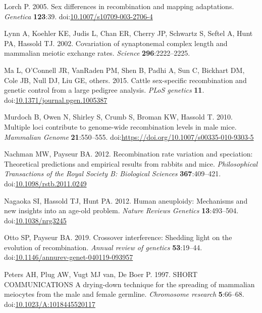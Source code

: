 \documentclass[
]{article}
\begin{document}
\leavevmode\hypertarget{ref-lorch2005}{}%
Lorch P. 2005. Sex differences in recombination and mapping adaptations.
\emph{Genetica} \textbf{123}:39.
doi:\href{https://doi.org/10.1007/s10709-003-2706-4}{10.1007/s10709-003-2706-4}

\leavevmode\hypertarget{ref-lynn2002}{}%
Lynn A, Koehler KE, Judis L, Chan ER, Cherry JP, Schwartz S, Seftel A,
Hunt PA, Hassold TJ. 2002. Covariation of synaptonemal complex length
and mammalian meiotic exchange rates. \emph{Science}
\textbf{296}:2222--2225.

\leavevmode\hypertarget{ref-ma2015_cattle}{}%
Ma L, O'Connell JR, VanRaden PM, Shen B, Padhi A, Sun C, Bickhart DM,
Cole JB, Null DJ, Liu GE, others. 2015. Cattle sex-specific
recombination and genetic control from a large pedigree analysis.
\emph{PLoS genetics} \textbf{11}.
doi:\href{https://doi.org/10.1371/journal.pgen.1005387}{10.1371/journal.pgen.1005387}

\leavevmode\hypertarget{ref-murdoch2010}{}%
Murdoch B, Owen N, Shirley S, Crumb S, Broman KW, Hassold T. 2010.
Multiple loci contribute to genome-wide recombination levels in male
mice. \emph{Mammalian Genome} \textbf{21}:550--555.
doi:\href{https://doi.org/https://doi.org/10.1007/s00335-010-9303-5}{https://doi.org/10.1007/s00335-010-9303-5}

\leavevmode\hypertarget{ref-nachman2012}{}%
Nachman MW, Payseur BA. 2012. Recombination rate variation and
speciation: Theoretical predictions and empirical results from rabbits
and mice. \emph{Philosophical Transactions of the Royal Society B:
Biological Sciences} \textbf{367}:409--421.
doi:\href{https://doi.org/10.1098/rstb.2011.0249}{10.1098/rstb.2011.0249}

\leavevmode\hypertarget{ref-nagaoka2012}{}%
Nagaoka SI, Hassold TJ, Hunt PA. 2012. Human aneuploidy: Mechanisms and
new insights into an age-old problem. \emph{Nature Reviews Genetics}
\textbf{13}:493--504.
doi:\href{https://doi.org/10.1038/nrg3245}{10.1038/nrg3245}

\leavevmode\hypertarget{ref-ottoPaysuer2019}{}%
Otto SP, Payseur BA. 2019. Crossover interference: Shedding light on the
evolution of recombination. \emph{Annual review of genetics}
\textbf{53}:19--44.
doi:\href{https://doi.org/10.1146/annurev-genet-040119-093957}{10.1146/annurev-genet-040119-093957}

\leavevmode\hypertarget{ref-peters_1997}{}%
Peters AH, Plug AW, Vugt MJ van, De Boer P. 1997. SHORT COMMUNICATIONS A
drying-down technique for the spreading of mammalian meiocytes from the
male and female germline. \emph{Chromosome research} \textbf{5}:66--68.
doi:\href{https://doi.org/10.1023/A:1018445520117}{10.1023/A:1018445520117}
\end{document}
